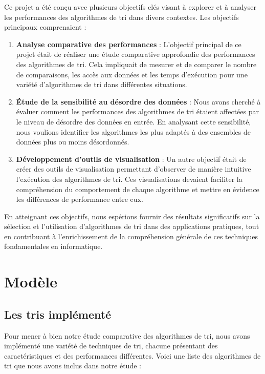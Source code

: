 \documentclass[a4paper,12pt]{article}
\begin{document}
Ce projet a été conçu avec plusieurs objectifs clés visant à explorer et à analyser les performances des algorithmes de tri dans divers contextes. Les objectifs principaux comprenaient :

\begin{enumerate}
\item \textbf{Analyse comparative des performances} : L'objectif principal de ce projet était de réaliser une étude comparative approfondie des performances des algorithmes de tri. Cela impliquait de mesurer et de comparer le nombre de comparaisons, les accès aux données et les temps d'exécution pour une variété d'algorithmes de tri dans différentes situations.

\item \textbf{Étude de la sensibilité au désordre des données} : Nous avons cherché à évaluer comment les performances des algorithmes de tri étaient affectées par le niveau de désordre des données en entrée. En analysant cette sensibilité, nous voulions identifier les algorithmes les plus adaptés à des ensembles de données plus ou moins désordonnés.

\item \textbf{Développement d'outils de visualisation} : Un autre objectif était de créer des outils de visualisation permettant d'observer de manière intuitive l'exécution des algorithmes de tri. Ces visualisations devaient faciliter la compréhension du comportement de chaque algorithme et mettre en évidence les différences de performance entre eux.

\end{enumerate}

En atteignant ces objectifs, nous espérions fournir des résultats significatifs sur la sélection et l'utilisation d'algorithmes de tri dans des applications pratiques, tout en contribuant à l'enrichissement de la compréhension générale de ces techniques fondamentales en informatique.


\section{Modèle}
\subsection{Les tris implémenté}
Pour mener à bien notre étude comparative des algorithmes de tri, nous avons implémenté une variété de techniques de tri, chacune présentant des caractéristiques et des performances différentes. Voici une liste des algorithmes de tri que nous avons inclus dans notre étude : \\
\end{document}
